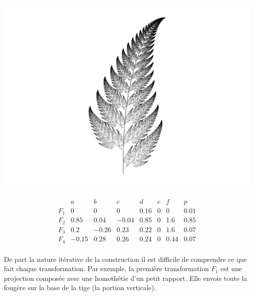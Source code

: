 \documentclass[11pt,class=report,crop=false]{standalone}
\begin{document}
\begin{center}
\includegraphics[scale=\myscale,scale=0.8]{figures/ifs-01}
\end{center}

\begin{displaymath}
\begin{array}{c|ccccccc}
     & a & b & c & d & e & f & p\\
\hline
F_1 & 0 & 0 & 0 & 0.16 & 0 & 0 & 0.01\\
\hline
F_2  & 0.85 &0.04&-0.04&0.85&0&1.6 & 0.85 \\
\hline
F_3 & 0.2 & -0.26 & 0.23 & 0.22 & 0 & 1.6 & 0.07 \\
\hline
F_4  & -0.15 & 0.28 & 0.26 & 0.24 & 0 & 0.44 & 0.07 \\
\end{array}
\end{displaymath}

\medskip

De part la nature itérative de la construction il est difficile de comprendre ce que fait chaque transformation. Par exemple, la première transformation $F_1$ est une projection composée avec une homothétie d'un petit rapport. Elle envoie toute la fougère sur la base de la tige (la portion verticale).

%
\end{document}
